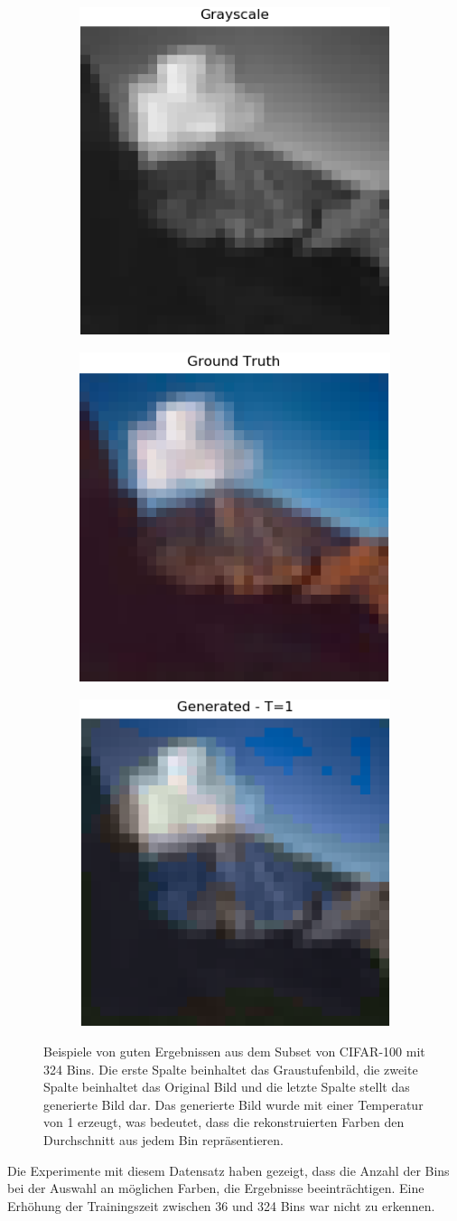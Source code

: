 \begin{figure}[H]
  \begin{subfigure}
    \centering
    \includegraphics[width=.24\textwidth]{resources/experiments/cifar/600_grayscale.png}
  \end{subfigure}
  \begin{subfigure}
    \centering
    \includegraphics[width=.24\textwidth]{resources/experiments/cifar/600_original.png}
  \end{subfigure}
  \begin{subfigure}
    \centering
    \includegraphics[width=.24\textwidth]{resources/experiments/cifar/600_t1.png}
  \end{subfigure}
  \caption{Beispiele von guten Ergebnissen aus dem Subset von CIFAR-100 mit 324 Bins. Die erste Spalte beinhaltet das Graustufenbild, die zweite Spalte
  beinhaltet das Original Bild und die letzte Spalte stellt das generierte Bild dar. Das generierte Bild wurde mit einer Temperatur von 1
  erzeugt, was bedeutet, dass die rekonstruierten Farben den Durchschnitt aus jedem Bin repräsentieren.}
  \label{image:gute-ergebnisse-cifar}
\end{figure}

Die Experimente mit diesem Datensatz haben gezeigt, dass die Anzahl der Bins bei der Auswahl an möglichen Farben, die Ergebnisse beeinträchtigen.
Eine Erhöhung der Trainingszeit zwischen 36 und 324 Bins war nicht zu erkennen.

